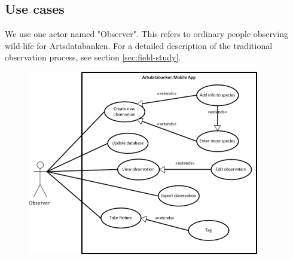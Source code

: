 \clearpage
\subsection{Use cases}
\label{sec:usecases}

We use one actor named "Observer". This refers to ordinary people observing
wild-life for Artsdatabanken. For a detailed description of the traditional
observation process, see section \ref{sec:field-study}.

\begin{figure}[!htb]
	\centering
	\includegraphics[width=0.9\textwidth]{reqspec/mainusecase.jpg}
	\label{fig:usecase}
\end{figure}

\newpage

